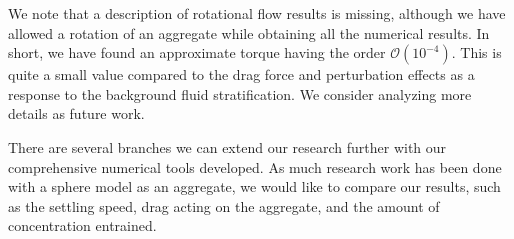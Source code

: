 We note that a description of rotational flow results is missing, although we have allowed a rotation of an aggregate while obtaining all the numerical results. In short, we have found an approximate torque having the order $\mathcal{O}(10^{-4})$. This is quite a small value compared to the drag force and perturbation effects as a response to the background fluid stratification. 
We consider analyzing more details as future work.
\par
There are several branches we can extend our research further with our comprehensive numerical tools developed. As much research work has been done with a sphere model as an aggregate, we would like to compare our results, such as the settling speed, drag acting on the aggregate, and the amount of concentration entrained. 


